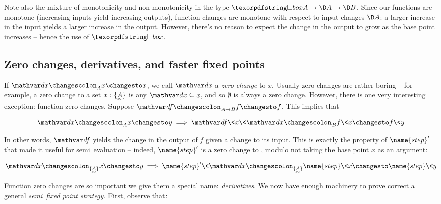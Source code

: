 

Note also the mixture of monotonicity and non-monotonicity in the type $\iso A
\to \D A \to \D B$. Since our functions are monotone (increasing inputs yield
increasing outputs), function changes are monotone with respect to input changes
$\D A$: a larger increase in the input yields a larger increase in the output.
However, there's no reason to expect the change in the output to grow as the
base point increases -- hence the use of $\iso$.


\subsection{Zero changes, derivatives, and faster fixed points}
\label{sec:derivatives}

If $\changesat A \dx x x$, we call $\dx$ a \emph{zero change} to $x$. Usually
zero changes are rather boring -- for example, a zero change to a set $x :
\tseteq{A}$ is any $\dx \subseteq x$, and so $\emptyset$ is always a zero
change.
%
However, there is one very interesting exception: function zero changes. Suppose
$\changesat{A \to B}{\df}{f}{f}$. This implies that

\begin{equation*}
  \changesat A \dx x y \implies \changesat B{\df\<x\<\dx}{f\<x}{f\<y}
\end{equation*}

\noindent
In other words, $\df$ yields the change in the output of $f$ given a change to
its input.
%
This is exactly the property of $\name{step}'$ that made it useful for
semi\naive\ evaluation -- indeed, $\name{step}'$ is a zero change to
, modulo not taking the base point $x$ as an argument:

\[ \changesat{\tseteq A} \dx x y \implies
\changesat{\tseteq A}{\name{step}'\<\dx}{\name{step}\<x}{\name{step}\<y}
\]

\noindent
Function zero changes are so important we give them a special name:
\emph{derivatives}. We now have enough machinery to prove correct a
general \emph{semi\naive\ fixed point strategy}. First, observe that:


